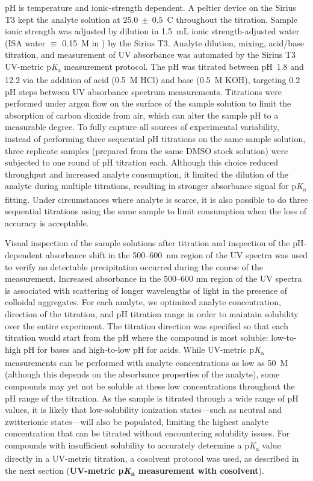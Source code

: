 \documentclass[9pt,lineno]{elife}
\newcommand{\pKa}{p\textit{K}\textsubscript{a}}
\begin{document}
pH is temperature and ionic-strength dependent. 
A peltier device on the Sirius T3 kept the analyte solution at $25.0~\pm~0.5$~\textdegree{}C throughout the titration. 
Sample ionic strength was adjusted by dilution in 1.5~mL ionic strength-adjusted water (ISA water $\equiv$ 0.15~M  in ) by the Sirius T3.  
Analyte dilution, mixing, acid/base titration, and measurement of UV absorbance was automated by the Sirius T3 UV-metric \pKa{} measurement protocol. 
The pH was titrated between pH~1.8 and 12.2 via the addition of acid (0.5~M HCl) and base (0.5~M KOH), targeting 0.2 pH steps between UV absorbance spectrum measurements. 
Titrations were performed under argon flow on the surface of the sample solution to limit the absorption of carbon dioxide from air, which can alter the sample pH to a measurable degree. 
To fully capture all sources of experimental variability, instead of performing three sequential pH titrations on the same sample solution, three replicate samples (prepared from the same DMSO stock solution) were subjected to one round of pH titration each. 
Although this choice reduced throughput and increased analyte consumption, it limited the dilution of the analyte during multiple titrations, resulting in stronger absorbance signal for \pKa{} fitting. Under circumstances where analyte is scarce, it is also possible to do three sequential titrations using the same sample to limit consumption when the loss of accuracy is acceptable. 

Visual inspection of the sample solutions after titration and inspection of the pH-dependent absorbance shift in the 500--600~nm region of the UV spectra was used to verify no detectable precipitation occurred during the course of the measurement. 
Increased absorbance in the 500--600 nm region of the UV spectra is associated with scattering of longer wavelengths of light in the presence of colloidal aggregates. 
For each analyte, we optimized analyte concentration, direction of the titration, and pH titration range in order to maintain solubility over the entire experiment. 
The titration direction was specified so that each titration would start from the pH where the compound is most soluble: low-to-high pH for bases and high-to-low pH for acids. 
While UV-metric \pKa{} measurements can be performed with analyte concentrations as low as 50~{\micro}M (although this depends on the absorbance properties of the analyte), some compounds may yet not be soluble at these low concentrations throughout the pH range of the titration. 
As the sample is titrated through a wide range of pH values, it is likely that low-solubility ionization states---such as neutral and zwitterionic states---will also be populated, limiting the highest analyte concentration that can be titrated without encountering solubility issues.  
For compounds with insufficient solubility to accurately determine a \pKa{} value directly in a UV-metric titration, a cosolvent protocol was used, as described in the next section ({\bf UV-metric \pKa{} measurement with cosolvent}). 
\end{document}
